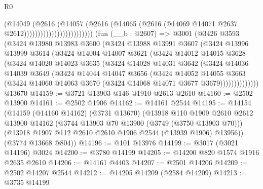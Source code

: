 \begin{lexlean}{R0}
\begin{coremodule}
                                        (@14049
                                          (@2616
                                            (@14057
                                              (@2616
                                                (@14065
                                                  (@2616
                                                    (@14069
                                                      @14071
                                                      @2637
                                                      @2612)))))))))))))))))))))))))
    (fun (__b : @2607) =>
    @3001
      (@3426
        @3593
        (@3424
          @13980
          @13983
          @3600
          (@3424
            @13988
            @13991
            @3607
            (@3424
              @13996
              @13999
              @3614
              (@3424
                @14004
                @14007
                @3621
                (@3424
                  @14012
                  @14015
                  @3628
                  (@3424
                    @14020
                    @14023
                    @3635
                    (@3424
                      @14028
                      @14031
                      @3642
                      (@3424
                        @14036
                        @14039
                        @3649
                        (@3424
                          @14044
                          @14047
                          @3656
                          (@3424
                            @14052
                            @14055
                            @3663
                            (@3424
                              @14060
                              @14063
                              @3670
                              (@3424 @14068 @14071 @3677 @3679))))))))))))))
    @13670
@14159 := @3721 @13903 @146 @1910 @2613 @2610
@14160 := @2502 @13900
@14161 := @2502 @1906
@14162 := @14161 @2544
@14195 := @14154
    (@14159
      (@14160 @14162)
      (@3731 @13670)
      (@13918
        @110
        @1909
        @2610
        @2612
        @13900
        @14162
        (@3744 @13903 @70 @13900 (@3749 (@3750 @13903 @70)))
        (@13918 @1907 @112 @2610 @2610 @1906 @2544 (@13939 @1906) @13956))
      (@3774 @13668 @804))
@14196 := @101 @13976
@14199 := @3017 (@3021 @14196) @3024
@14200 := @3780 @14199
@14205 := @14200 @820 @1574 @1916 @2635 @2610
@14206 := @14161 @4403
@14207 := @2501 @14206
@14209 := @2502 @14207 @2544
@14212 := @14205 @14209 (@2584 @14209)
@14213 := @3735 @14199

\end{coremodule}
\end{lexlean}
